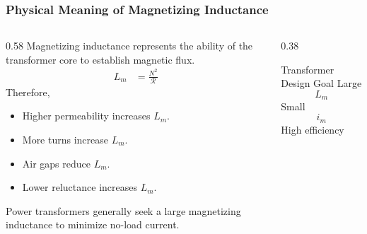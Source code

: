 \begin{frame}
    \frametitle{Physical Meaning of Magnetizing Inductance}
    \begin{columns}
        \begin{column}{0.58\textwidth}
            Magnetizing inductance represents the ability of the transformer core to establish magnetic flux.
            \vspace{0.15cm}
            \begin{align}
                L_m &= \frac{N^2}{\mathcal R}
            \end{align}
            Therefore,
            \begin{itemize}
                \item Higher permeability increases $L_m$.
                \item More turns increase $L_m$.
                \item Air gaps reduce $L_m$.
                \item Lower reluctance increases $L_m$.
            \end{itemize}
            \vspace{0.15cm}
            Power transformers generally seek a large magnetizing inductance to minimize no-load current.
        \end{column}
        \begin{column}{0.38\textwidth}
            \begin{block}{Transformer Design Goal}
                Large
                \begin{equation}
                    L_m
                \end{equation}
                \vspace{0.15cm}
                Small
                \begin{equation}
                    i_m
                \end{equation}
                \vspace{0.15cm}
                High efficiency
            \end{block}
        \end{column}
    \end{columns}
\end{frame}



